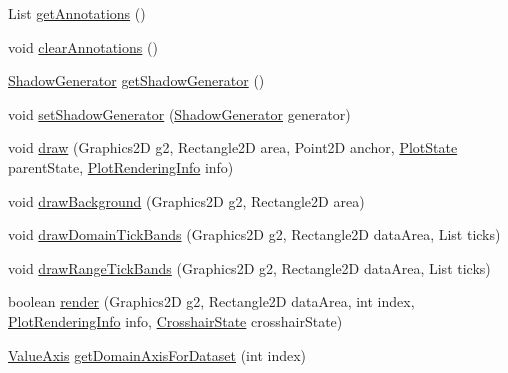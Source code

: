 \begin{DoxyCompactItemize}
\item 
List \mbox{\hyperlink{classorg_1_1jfree_1_1chart_1_1plot_1_1_x_y_plot_a65d05a1b516c28eed73f42fb7aa9f92f}{get\+Annotations}} ()
\item 
void \mbox{\hyperlink{classorg_1_1jfree_1_1chart_1_1plot_1_1_x_y_plot_acb691b3a18d23dfc8eec57a6bdacbc88}{clear\+Annotations}} ()
\item 
\mbox{\hyperlink{interfaceorg_1_1jfree_1_1chart_1_1util_1_1_shadow_generator}{Shadow\+Generator}} \mbox{\hyperlink{classorg_1_1jfree_1_1chart_1_1plot_1_1_x_y_plot_afbe6ac8a95eb7c0907d48dcddbf1ae3e}{get\+Shadow\+Generator}} ()
\item 
void \mbox{\hyperlink{classorg_1_1jfree_1_1chart_1_1plot_1_1_x_y_plot_ad0b70c56e64616d9f4940c278b39e393}{set\+Shadow\+Generator}} (\mbox{\hyperlink{interfaceorg_1_1jfree_1_1chart_1_1util_1_1_shadow_generator}{Shadow\+Generator}} generator)
\item 
void \mbox{\hyperlink{classorg_1_1jfree_1_1chart_1_1plot_1_1_x_y_plot_a4527611089d47dba8e48dd6a5bb88cdc}{draw}} (Graphics2D g2, Rectangle2D area, Point2D anchor, \mbox{\hyperlink{classorg_1_1jfree_1_1chart_1_1plot_1_1_plot_state}{Plot\+State}} parent\+State, \mbox{\hyperlink{classorg_1_1jfree_1_1chart_1_1plot_1_1_plot_rendering_info}{Plot\+Rendering\+Info}} info)
\item 
void \mbox{\hyperlink{classorg_1_1jfree_1_1chart_1_1plot_1_1_x_y_plot_afd21892abe5402f18cda6fbc5a6f8f48}{draw\+Background}} (Graphics2D g2, Rectangle2D area)
\item 
void \mbox{\hyperlink{classorg_1_1jfree_1_1chart_1_1plot_1_1_x_y_plot_a244e86624ced5f68c82c648a8d968e53}{draw\+Domain\+Tick\+Bands}} (Graphics2D g2, Rectangle2D data\+Area, List ticks)
\item 
void \mbox{\hyperlink{classorg_1_1jfree_1_1chart_1_1plot_1_1_x_y_plot_a5659ddae75602975d7cba2e77854671a}{draw\+Range\+Tick\+Bands}} (Graphics2D g2, Rectangle2D data\+Area, List ticks)
\item 
boolean \mbox{\hyperlink{classorg_1_1jfree_1_1chart_1_1plot_1_1_x_y_plot_a3afcd204a9dca6fed9bf8fc90b37d2cb}{render}} (Graphics2D g2, Rectangle2D data\+Area, int index, \mbox{\hyperlink{classorg_1_1jfree_1_1chart_1_1plot_1_1_plot_rendering_info}{Plot\+Rendering\+Info}} info, \mbox{\hyperlink{classorg_1_1jfree_1_1chart_1_1plot_1_1_crosshair_state}{Crosshair\+State}} crosshair\+State)
\item 
\mbox{\hyperlink{classorg_1_1jfree_1_1chart_1_1axis_1_1_value_axis}{Value\+Axis}} \mbox{\hyperlink{classorg_1_1jfree_1_1chart_1_1plot_1_1_x_y_plot_a78335ba6961d17e7f85b3f780caad54f}{get\+Domain\+Axis\+For\+Dataset}} (int index)

\end{DoxyCompactItemize}
